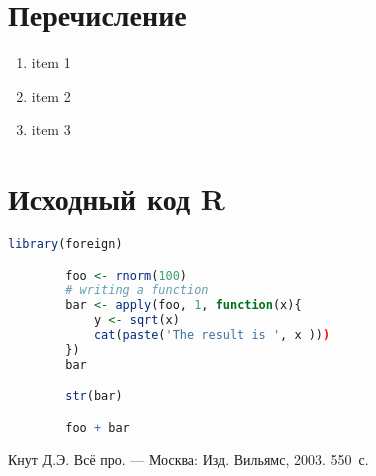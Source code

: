 \documentclass[14pt,a4paper]{scrartcl}
\begin{document}
    \section{Перечисление}
    \begin{enumerate}
        \item item 1
        \item item 2
        \item item 3
    \end{enumerate}

    \section{Исходный код R}
    \begin{lstlisting}[language=R]
        library(foreign)

        foo <- rnorm(100)
        # writing a function
        bar <- apply(foo, 1, function(x){
            y <- sqrt(x)
            cat(paste('The result is ', x )))
        })
        bar

        str(bar)

        foo + bar
    \end{lstlisting}

    \newpage
    \begin{thebibliography}{9}
        Кнут Д.Э. Всё про. \newblock --- Москва: Изд. Вильямс, 2003. 550~с.
    \end{thebibliography}
\end{document}
